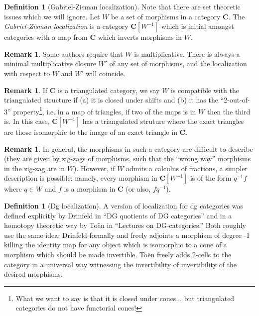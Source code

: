 \documentclass[10pt]{article}
\theoremstyle{definition}
\newtheorem{defn}[thm]{Definition}
\newtheorem{rmk}[thm]{Remark}
\newcommand{\cat}{\mathbf}
\begin{document}
\begin{defn}[Gabriel-Zisman localization]
Note that there are set theoretic issues which we will ignore.  Let $W$ be a set of morphisms in a category $\cat{C}$.  The \emph{Gabriel-Zisman localization} is a category $\cat{C}[W^{-1}]$ which is initial amongst categories with a map from $\cat{C}$ which inverts morphisms in $W$.
\end{defn}

\begin{rmk}
Some authors require that $W$ is multiplicative.  There is always a minimal multiplicative closure $W'$ of any set of morphisms, and the localization with respect to $W$ and $W'$ will coincide.
\end{rmk}

\begin{rmk}
If $\cat{C}$ is a triangulated category, we say $W$ is compatible with the triangulated structure if (a) it is closed under shifts and (b) it has the ``2-out-of-3'' property\footnote{What we want to say is that it is closed under cones... but triangulated categories do not have functorial cones!}, i.e. in a map of triangles, if two of the maps is in $W$ then the third is.  In this case, $\cat{C}[W^{-1}]$ has a triangulated struture where the exact triangles are those isomorphic to the image of an exact triangle in $\cat{C}$.
\end{rmk}

\begin{rmk}
In general, the morphisms in such a category are difficult to describe (they are given by zig-zags of morphisms, such that the ``wrong way'' morphisms in the zig-zag are in $W$).  However, if $W$ admits a calculus of fractions, a simpler description is possible: namely, every morphism in $\cat{C}[W^{-1}]$ is of the form $q^{-1}f$ where $q \in W$ and $f$ is a morphism in $\cat{C}$ (or also, $fq^{-1}$).
\end{rmk}

\begin{defn}[Dg localization]
A version of localization for dg categories was defined explicitly by Drinfeld in ``DG quotients of DG categories'' and in a homotopy theoretic way by To\"en in ``Lectures on DG-categories.''  Both roughly use the same idea: Drinfeld formally and freely adjoints a morphism of degree -1 killing the identity map for any object which is isomorphic to a cone of a morphism which should be made invertible.  To\"en freely adds 2-cells to the category in a universal way witnessing the invertibility of invertibility of the desired morphisms.
\end{defn}
\end{document}
